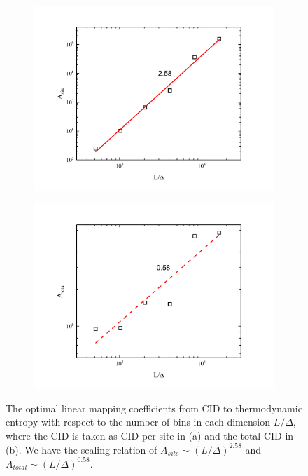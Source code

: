 \documentclass[a4paper]{article}
\begin{document}
\begin{figure}[ht]
	\begin{subfigure}[ht]{.5\textwidth}
		\centering 
		\includegraphics[width=1\columnwidth]{Asite.png}
		\caption{}
		\label{fig:Asite}
	\end{subfigure}
	\begin{subfigure}[ht]{.5\textwidth}
		\centering
		\includegraphics[width=1\columnwidth]{Atot.png}
		\caption{}
		\label{fig:Atot}
	\end{subfigure}
	\caption{
		 The optimal linear mapping coefficients from CID to thermodynamic entropy with respect to the number of bins in each dimension $L/\Delta$, where the CID is taken as CID per site in (a) and the total CID in (b). We have the scaling relation of $A_{site} \sim (L/\Delta)^{2.58}$ and $A_{total} \sim (L/\Delta)^{0.58}$.
	}
\end{figure}
\end{document}
